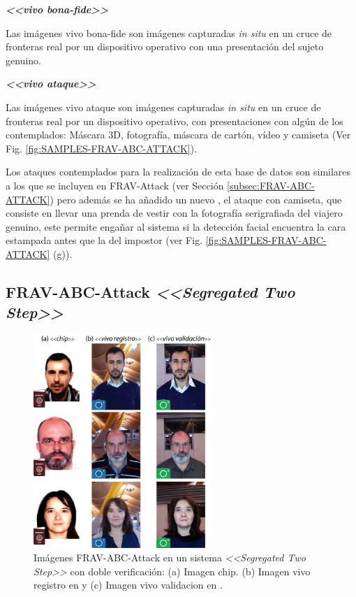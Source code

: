 \medskip
\textbf{\textit{<<vivo bona-fide>>}}

Las imágenes \gls{vivo bona-fide} son imágenes capturadas \textit{in situ} en un cruce de fronteras real por un dispositivo  operativo con una presentación del sujeto genuino.

\medskip
\textbf{\textit{<<vivo ataque>>}}

Las imágenes \gls{vivo ataque} son imágenes capturadas \textit{in situ} en un cruce de fronteras real por un dispositivo  operativo, con presentaciones con algún  de los contemplados: Máscara $3$D, fotografía, máscara de cartón, vídeo y camiseta (Ver Fig. \ref{fig:SAMPLES-FRAV-ABC-ATTACK}).
\medskip

Los ataques contemplados para la realización de esta base de datos son similares a los que se incluyen en \Gls{FRAV-Attack} (ver Sección \ref{subsec:FRAV-ABC-ATTACK}) pero además se ha añadido un nuevo , el ataque con camiseta, que consiste en llevar una prenda de vestir con la fotografía serigrafiada del viajero genuino, este  permite engañar al sistema si la detección facial encuentra la cara estampada antes que la del impostor (ver Fig. \ref{fig:SAMPLES-FRAV-ABC-ATTACK} (g)).

\subsection{FRAV-ABC-Attack \textit{<<Segregated Two Step>>}}\label{subsec:FRAV-ABC-ATTACK-DOS_PASOS}

\begin{figure}[ht]
     \centering
     \includegraphics[width=0.6\textwidth]{ch-sistemasABC/images/ch-BBDDs/VERIFICACION_DAVID_ENRIQUE_CRISITNA_DOS_PASOS.png}
     \caption{Imágenes \gls{FRAV-ABC-Attack} en un sistema  \textit{<<Segregated Two Step>>} con doble verificación: (a) Imagen \gls{chip}. (b) Imagen \gls{vivo registro} en   y (c) Imagen \gls{vivo validacion} en .}
     \label{fig:Imagenes_ABC_Attack_dosPasos}
\end{figure}

